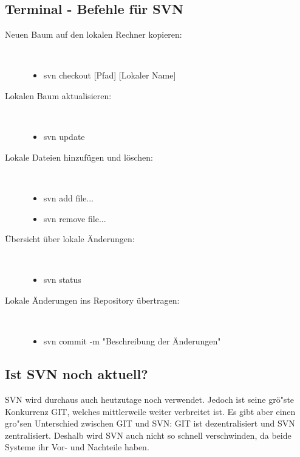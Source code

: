  \subsection{Terminal - Befehle f\"ur SVN}
 \begin{description}
\item[Neuen Baum auf den lokalen Rechner kopieren:]~\par
   \begin{itemize}
      \item svn checkout [Pfad] [Lokaler Name]
   \end{itemize}
\item[Lokalen Baum aktualisieren:]~\par
   \begin{itemize}
      \item svn update
   \end{itemize}
\item[Lokale Dateien hinzuf\"ugen und l\"oschen:]~\par
   \begin{itemize}
      \item svn add file...
      \item svn remove file...
   \end{itemize}
   \item[\"Ubersicht \"uber lokale \"Anderungen:]~\par
   \begin{itemize}
      \item svn status
   \end{itemize}
      \item[Lokale \"Anderungen ins Repository \"ubertragen:]~\par
   \begin{itemize}
      \item svn commit -m "Beschreibung der Änderungen"~\par
   \end{itemize}
\end{description}

\subsection{Ist SVN noch aktuell?}
SVN wird durchaus auch heutzutage noch verwendet. Jedoch ist seine gr\"o"ste Konkurrenz GIT, welches mittlerweile weiter verbreitet ist. Es gibt aber einen gro"sen Unterschied zwischen GIT und SVN: GIT ist dezentralisiert und SVN zentralisiert. Deshalb wird SVN auch nicht so schnell verschwinden, da beide Systeme ihr Vor- und Nachteile haben.
